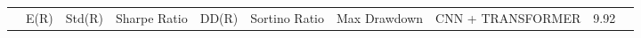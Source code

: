\begin{tabular}{lrrrrrrrrr}
 & E(R) & Std(R) & Sharpe Ratio & DD(R) & Sortino Ratio & Max Drawdown & %
CNN + TRANSFORMER & 9.92%
\end{tabular}
